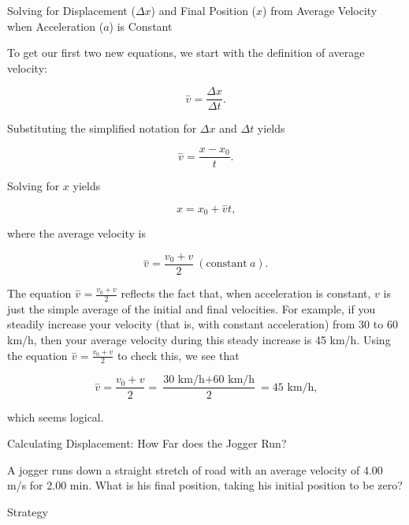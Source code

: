 \documentclass[
]{book}
\newenvironment{tinysection}{}{}
\newenvironment{note}{}{}
\begin{document}
\hypertarget{fs-id1164906424651}{}
\begin{note}

Solving for Displacement (\(\Delta x\)) and Final Position (\(x{}\)) from
Average Velocity when Acceleration (\(a{}\)) is Constant

To get our first two new equations, we start with the definition of
average velocity:

\leavevmode\hypertarget{import-auto-id1782525}{}%
\[{{\overset{-}{v} = \frac{\Delta x}{\Delta t}}\text{.}}{}\]

Substituting the simplified notation for \(\Delta x\) and \(\Delta t\)
yields

\leavevmode\hypertarget{import-auto-id4145482}{}%
\[{{\overset{-}{v} = \frac{x - x_{0}}{t}}\text{.}}{}\]

Solving for \(x{}\) yields

\leavevmode\hypertarget{import-auto-id2297251}{}%
\[{{x = {x_{0} + \overset{-}{v}}}t\text{,}}{}\]

where the average velocity is

\leavevmode\hypertarget{import-auto-id2086556}{}%
\[{{\overset{-}{v} = \frac{v_{0} + v}{2}}\ (\text{constant}\ a)\text{.}}{}\]

\end{note}

The equation \({\overset{-}{v} = \frac{v_{0} + v}{2}}{}\) reflects the
fact that, when acceleration is constant, \(v{}\) is just the simple
average of the initial and final velocities. For example, if you
steadily increase your velocity (that is, with constant acceleration)
from 30 to 60 km/h, then your average velocity during this steady
increase is 45 km/h. Using the equation
\({\overset{-}{v} = \frac{v_{0} + v}{2}}{}\) to check this, we see that

\leavevmode\hypertarget{import-auto-id4152098}{}%
\[{{{\overset{-}{v} = \frac{v_{0} + v}{2}} = \frac{\text{30\ km/h} + \text{60\ km/h}}{2}} = \text{45\ km/h,}}{}\]

which seems logical.

\hypertarget{fs-id1164906442368}{}
Calculating Displacement: How Far does the Jogger Run?

A jogger runs down a straight stretch of road with an average velocity
of 4.00 m/s for 2.00 min. What is his final position, taking his initial
position to be zero?

\begin{tinysection}

{Strategy}

\end{tinysection}
\end{document}
